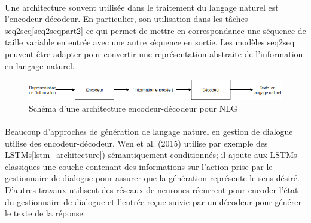 \paragraph{}
Une architecture souvent utilisée dans le traitement du langage naturel est l’encodeur-décodeur. En particulier, son utilisation dans les tâches seq2seq\ref{seq2seqpart2} ce qui permet de mettre en correspondance une séquence de taille variable en entrée avec une autre séquence en sortie. Les modèles seq2seq peuvent être adapter pour convertir une représentation abstraite de l’information en langage naturel\cite{Ferreira2017}.\newline
\begin{figure}[H]
	\centering
	\includegraphics[width=.95\linewidth]{images/NLG/Encoder.png} 
	\caption{Schéma d'une architecture encodeur-décodeur pour NLG} 
\end{figure}
\paragraph{}
Beaucoup d’approches de génération de langage naturel en gestion de dialogue utilise des encodeur-décodeur. Wen et al. (2015)\cite{Wen2015} utilise par exemple des LSTMs\ref{lstm_architecture}) sémantiquement conditionnés; il ajoute aux LSTMs classiques une couche contenant des informations sur l’action prise par le gestionnaire de dialogue pour assurer que la génération représente le sens désiré. D’autres travaux utilisent des réseaux de neurones récurrent pour encoder l’état du gestionnaire de dialogue et l’entrée reçue suivie par un décodeur pour générer le texte de la réponse\cite{Sordoni2015,Serban2016,Goyal2016}.
	